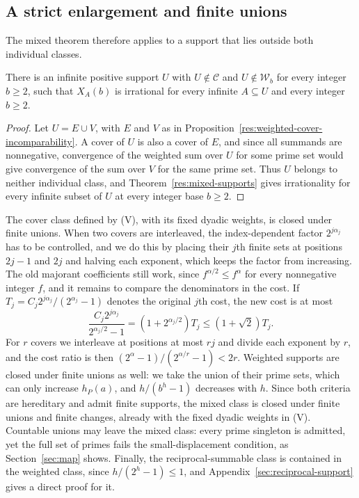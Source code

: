 \documentclass[11pt]{article}
\begin{document}
\subsection{A strict enlargement and finite unions}
The mixed theorem therefore applies to a support that lies outside both
individual classes.
\begin{corollary}
\label{res:strict-mixed-supports}
There is an infinite positive support $U$ with
$U\notin\mathcal C$ and $U\notin\mathcal W_b$ for every integer $b\ge2$,
such that $X_A(b)$ is irrational for every infinite $A\subseteq U$
and every integer $b\ge2$.
\end{corollary}
\begin{proof}
Let $U=E\cup V$, with $E$ and $V$ as in
Proposition~\ref{res:weighted-cover-incomparability}. A cover of $U$
is also a cover of $E$, and since all summands are nonnegative,
convergence of the weighted sum over $U$ for some prime set would give
convergence of the sum over $V$ for the same prime set. Thus $U$
belongs to neither individual class, and Theorem~\ref{res:mixed-supports}
gives irrationality for every infinite subset of $U$ at every integer
base $b\ge2$.
\end{proof}
The cover class defined by (V), with its fixed dyadic weights, is
closed under finite unions. When two covers are interleaved, the
index-dependent factor $2^{j\alpha_j}$ has to be controlled, and we do
this by placing their $j$th finite sets at positions $2j-1$ and $2j$
and halving each exponent, which keeps the factor from increasing. The
old majorant coefficients still work, since $f^{\alpha/2}\le f^\alpha$
for every nonnegative integer $f$, and it remains to compare the
denominators in the cost. If $T_j=C_j2^{j\alpha_j}/(2^{\alpha_j}-1)$
denotes the original $j$th cost, the new cost is at most
\[
 \frac{C_j2^{j\alpha_j}}{2^{\alpha_j/2}-1}
 =(1+2^{\alpha_j/2})T_j\le(1+\sqrt2)T_j.
\]
For $r$ covers we interleave at positions at most $rj$ and divide each
exponent by $r$, and the cost ratio is then
$(2^\alpha-1)/(2^{\alpha/r}-1)<2r$. Weighted supports are closed under
finite unions as well: we take the union of their prime sets, which can
only increase $h_P(a)$, and $h/(b^h-1)$ decreases with $h$. Since both
criteria are hereditary and admit finite supports, the mixed class is
closed under finite unions and finite changes, already with the fixed
dyadic weights in (V). Countable unions may leave the mixed class:
every prime singleton is admitted, yet the full set of primes fails the
small-displacement condition, as Section~\ref{sec:map} shows. Finally,
the reciprocal-summable class is contained in the weighted class, since
$h/(2^h-1)\le1$, and Appendix~\ref{sec:reciprocal-support} gives a
direct proof for it.
\end{document}
